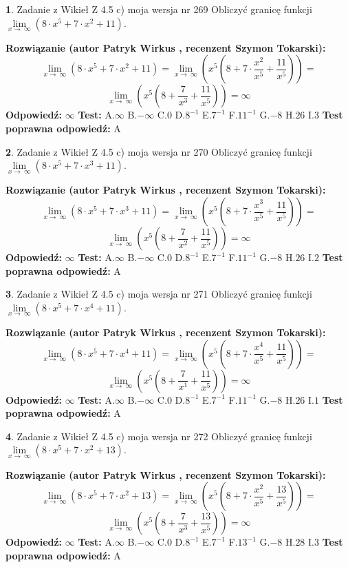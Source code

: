 \documentclass[12pt, a4paper]{article}
\theoremstyle{definition} %
\newtheorem{zad}{}
\newcommand{\zadStart}[1]{\begin{zad}#1\newline}
\newcommand{\zadStop}{\end{zad}}
\newcommand{\rozwStart}[2]{\noindent \textbf{Rozwiązanie (autor #1 , recenzent #2): }\newline}
\newcommand{\rozwStop}{\newline}
\newcommand{\odpStart}{\noindent \textbf{Odpowiedź:}\newline}
\newcommand{\odpStop}{\newline}
\newcommand{\testStart}{\noindent \textbf{Test:}\newline}
\newcommand{\testStop}{\newline}
\newcommand{\kluczStart}{\noindent \textbf{Test poprawna odpowiedź:}\newline}
\newcommand{\kluczStop}{\newline}
\begin{document}
\zadStart{Zadanie z Wikieł Z 4.5 c) moja wersja nr 269}
Obliczyć granicę funkcji  $\lim\limits_{x\to\ \infty}(8 \cdot x^{5}+7 \cdot x^{2}+11)$.
\zadStop
\rozwStart{Patryk Wirkus}{Szymon Tokarski}
$$\lim\limits_{x\to\ \infty}(8 \cdot x^{5}+7 \cdot x^{2}+11) = \lim\limits_{x\to\ \infty}(x^{5}(8 +7 \cdot \frac{x^{2}}{x^{5}}+\frac{11}{x^{5}})) =$$ $$\lim\limits_{x\to\ \infty}(x^{5}(8 +\frac{7}{x^{3}}+\frac{11}{x^{5}})) =\infty$$
\rozwStop
\odpStart
$\infty$
\odpStop
\testStart
A.$\infty$ B.$-\infty$ C.$0$ D.$8^{-1}$ E.$7^{-1}$
F.$11^{-1}$ G.$-8$
H.$26$
I.$3$
\testStop
\kluczStart
A
\kluczStop



\zadStart{Zadanie z Wikieł Z 4.5 c) moja wersja nr 270}
Obliczyć granicę funkcji  $\lim\limits_{x\to\ \infty}(8 \cdot x^{5}+7 \cdot x^{3}+11)$.
\zadStop
\rozwStart{Patryk Wirkus}{Szymon Tokarski}
$$\lim\limits_{x\to\ \infty}(8 \cdot x^{5}+7 \cdot x^{3}+11) = \lim\limits_{x\to\ \infty}(x^{5}(8 +7 \cdot \frac{x^{3}}{x^{5}}+\frac{11}{x^{5}})) =$$ $$\lim\limits_{x\to\ \infty}(x^{5}(8 +\frac{7}{x^{2}}+\frac{11}{x^{5}})) =\infty$$
\rozwStop
\odpStart
$\infty$
\odpStop
\testStart
A.$\infty$ B.$-\infty$ C.$0$ D.$8^{-1}$ E.$7^{-1}$
F.$11^{-1}$ G.$-8$
H.$26$
I.$2$
\testStop
\kluczStart
A
\kluczStop



\zadStart{Zadanie z Wikieł Z 4.5 c) moja wersja nr 271}
Obliczyć granicę funkcji  $\lim\limits_{x\to\ \infty}(8 \cdot x^{5}+7 \cdot x^{4}+11)$.
\zadStop
\rozwStart{Patryk Wirkus}{Szymon Tokarski}
$$\lim\limits_{x\to\ \infty}(8 \cdot x^{5}+7 \cdot x^{4}+11) = \lim\limits_{x\to\ \infty}(x^{5}(8 +7 \cdot \frac{x^{4}}{x^{5}}+\frac{11}{x^{5}})) =$$ $$\lim\limits_{x\to\ \infty}(x^{5}(8 +\frac{7}{x^{1}}+\frac{11}{x^{5}})) =\infty$$
\rozwStop
\odpStart
$\infty$
\odpStop
\testStart
A.$\infty$ B.$-\infty$ C.$0$ D.$8^{-1}$ E.$7^{-1}$
F.$11^{-1}$ G.$-8$
H.$26$
I.$1$
\testStop
\kluczStart
A
\kluczStop



\zadStart{Zadanie z Wikieł Z 4.5 c) moja wersja nr 272}
Obliczyć granicę funkcji  $\lim\limits_{x\to\ \infty}(8 \cdot x^{5}+7 \cdot x^{2}+13)$.
\zadStop
\rozwStart{Patryk Wirkus}{Szymon Tokarski}
$$\lim\limits_{x\to\ \infty}(8 \cdot x^{5}+7 \cdot x^{2}+13) = \lim\limits_{x\to\ \infty}(x^{5}(8 +7 \cdot \frac{x^{2}}{x^{5}}+\frac{13}{x^{5}})) =$$ $$\lim\limits_{x\to\ \infty}(x^{5}(8 +\frac{7}{x^{3}}+\frac{13}{x^{5}})) =\infty$$
\rozwStop
\odpStart
$\infty$
\odpStop
\testStart
A.$\infty$ B.$-\infty$ C.$0$ D.$8^{-1}$ E.$7^{-1}$
F.$13^{-1}$ G.$-8$
H.$28$
I.$3$
\testStop
\kluczStart
A
\kluczStop
\end{document}
